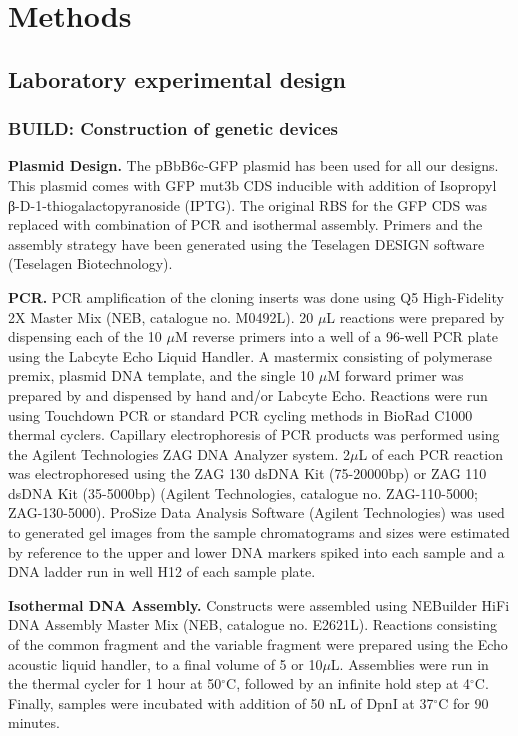 \section{Methods}

\subsection{Laboratory experimental design}

\subsubsection{BUILD: Construction of genetic devices}

\textbf{Plasmid Design.}
The pBbB6c-GFP plasmid has been used for all our designs.
This plasmid comes with GFP mut3b CDS inducible with addition of Isopropyl β-D-1-thiogalactopyranoside (IPTG).
The original RBS for the GFP CDS was replaced with combination of PCR and isothermal assembly.
Primers and the assembly strategy have been generated using the Teselagen DESIGN software (Teselagen Biotechnology).

\textbf{PCR.}
PCR amplification of the cloning inserts was done using Q5 High-Fidelity 2X Master Mix (NEB, catalogue no. M0492L).
20 $\mu$L reactions were prepared by dispensing each of the 10 $\mu$M reverse primers into a well of a 96-well PCR plate using the Labcyte Echo Liquid Handler.
A mastermix consisting of polymerase premix, plasmid DNA template, and the single 10 $\mu$M forward primer was prepared by and dispensed by hand and/or Labcyte Echo. Reactions were run using Touchdown PCR or standard PCR cycling methods in BioRad C1000 thermal cyclers.
Capillary electrophoresis of PCR products was performed using the Agilent Technologies ZAG DNA Analyzer system.
2$\mu$L of each PCR reaction was electrophoresed using the ZAG 130 dsDNA Kit (75-20000bp) or ZAG 110 dsDNA Kit (35-5000bp) (Agilent Technologies, catalogue no. ZAG-110-5000; ZAG-130-5000).
ProSize Data Analysis Software (Agilent Technologies) was used to generated gel images from the sample chromatograms and sizes were estimated by reference to the upper and lower DNA markers spiked into each sample and a DNA ladder run in well H12 of each sample plate. 

\textbf{Isothermal DNA Assembly.}
Constructs were assembled using NEBuilder HiFi DNA Assembly Master Mix (NEB, catalogue no. E2621L).
Reactions consisting of the common fragment and the variable fragment were prepared using the Echo acoustic liquid handler, to a final volume of 5 or 10\(\mu\)L.
Assemblies were run in the thermal cycler for 1 hour at 50$^{\circ}$C, followed by an infinite hold step at 4$^{\circ}$C.
Finally, samples were incubated with addition of 50 nL of DpnI at 37$^{\circ}$C for 90 minutes.

